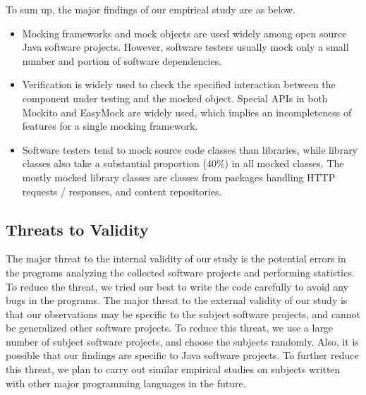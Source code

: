 To sum up, the major findings of our empirical study are as below.
\begin{itemize}
\item Mocking frameworks and mock objects are used widely among open source Java software projects. However, software testers usually mock only a small number and portion of software dependencies.

\item Verification is widely used to check the specified interaction between the component under testing and the mocked object. Special APIs in both Mockito and EasyMock are widely used, which implies an incompleteness of features for a single mocking framework. 

\item Software testers tend to mock source code classes than libraries, while library classes also take a substantial proportion (40\%) in all mocked classes. The mostly mocked library classes are classes from packages handling HTTP requests / responses, and content repositories. 

\end{itemize}


\subsection{Threats to Validity}
\label{subsec:threat}


The major threat to the internal validity of our study is the potential errors in the programs analyzing the collected software projects and performing statistics. To reduce the threat, we tried our best to write the code carefully to avoid any bugs in the programs. The major threat to the external validity of our study is that our observations may be specific to the subject software projects, and cannot be generalized other software projects. To reduce this threat, we use a large number of subject software projects, and choose the subjects randomly. Also, it is possible that our findings are specific to Java software projects. To further reduce this threat, we plan to carry out similar empirical studies on subjects written with other major programming languages in the future. 


